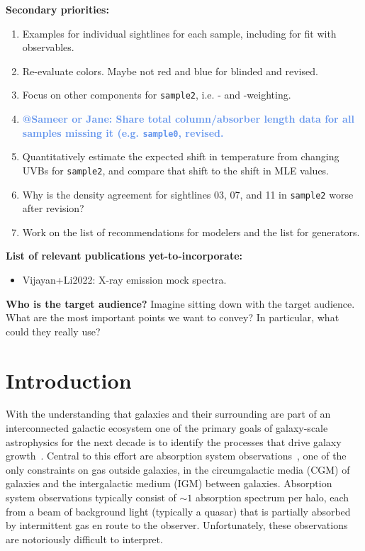 \documentclass[fleqn,usenatbib]{mnras}
\makeatletter
\newcommand{\atsameer}[1]{\textcolor{CornflowerBlue}{\textbf{@Sameer or Jane: #1}}}
\makeatother
\begin{document}
\textbf{Secondary priorities:}
\begin{enumerate}
    \item Examples for individual sightlines for each sample, including for fit with observables.
    \item Re-evaluate colors. Maybe not red and blue for blinded and revised.
    \item Focus on other components for \texttt{sample2}, i.e. - and -weighting.
    \item \atsameer{Share total column/absorber length data for all samples missing it (e.g. \texttt{sample0}, revised.}
    \item Quantitatively estimate the expected shift in temperature from changing UVBs for \texttt{sample2}, and compare that shift to the shift in MLE values.
    \item Why is the density agreement for sightlines 03, 07, and 11 in \texttt{sample2} worse after revision?
    \item Work on the list of recommendations for modelers and the list for generators.
\end{enumerate}

\textbf{List of relevant publications yet-to-incorporate:}
\begin{itemize}
    \item Vijayan+Li2022: X-ray emission mock spectra.
\end{itemize}

\textbf{Who is the target audience?}
Imagine sitting down with the target audience.
What are the most important points we want to convey?
In particular, what could they really use?

\section{Introduction}

With the understanding that galaxies and their surrounding are part of an interconnected galactic ecosystem one of the primary goals of galaxy-scale astrophysics for the next decade is to identify the processes that drive galaxy growth~\citep{Decadal2020}.
Central to this effort are absorption system observations~\citep[e.g.][]{Bahcall1993, Lanzetta1995, Lauroesch1996, Churchill1996}, one of the only constraints on gas outside galaxies, in the circumgalactic media (CGM) of galaxies and the intergalactic medium (IGM) between galaxies.
Absorption system observations typically consist of $\sim 1$ absorption spectrum per halo, each from a beam of background light (typically a quasar) that is partially absorbed by intermittent gas en route to the observer.
Unfortunately, these observations are notoriously difficult to interpret.
\end{document}
